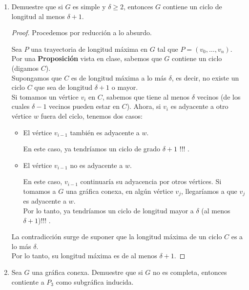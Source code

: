 \documentclass{article}
\begin{document}
\begin{enumerate}
    \item Demuestre que si $G$ es simple y $\delta \ge 2$, entonces $G$ contiene
    un ciclo de longitud al menos $\delta + 1$.

      \renewcommand\qedsymbol{QED}
      \begin{proof}
        Procedemos por reducción a lo absurdo.

        Sea $P$ una trayectoria de longitud máxima en $G$ tal que $P = (v_{0}, \dots, v_{n})$. \\
        Por una \textbf{Proposición} vista en clase, sabemos que $G$ contiene un ciclo (digamos $C$). \\
        Supongamos que $C$ es de longitud máxima a lo más $\delta$, es decir, no existe un ciclo $C$
        que sea de longitud $\delta + 1$ o mayor. \\
        Si tomamos un vértice $v_{i}$ en $C$, sabemos que tiene al menos $\delta$ vecinos (de los cuales
        $\delta - 1$ vecinos pueden estar en $C$). Ahora, si $v_{i}$ es
        adyacente a otro vértice $w$ fuera del ciclo, tenemos dos casos:
        \begin{itemize}
          \item El vértice $v_{i-1}$ también es adyacente a $w$.

            En este caso, ya tendríamos un ciclo de grado $\delta + 1$ !!! .

          \item El vértice $v_{i-1}$ no es adyacente a $w$.

            En este caso, $v_{i-1}$ continuaría su adyacencia por otros vértices. Si tomamos a $G$
            una gráfica conexa, en algún vértice $v_{j}$, llegaríamos a que $v_{j}$ es adyacente a $w$. \\
            Por lo tanto, ya tendríamos un ciclo de longitud mayor a $\delta$ (al menos $\delta + 1$)!!! .
        \end{itemize}

        La contradicción surge de suponer que la longitud máxima de un ciclo $C$ es a lo más $\delta$. \\
        Por lo tanto, su longitud máxima es de al menos $\delta + 1$.
      \end{proof}

    \item Sea $G$ una gr\'afica conexa. Demuestre que si $G$ no es completa,
      entonces contiente a $P_3$ como subgr\'afica inducida.


\end{enumerate}
\end{document}
